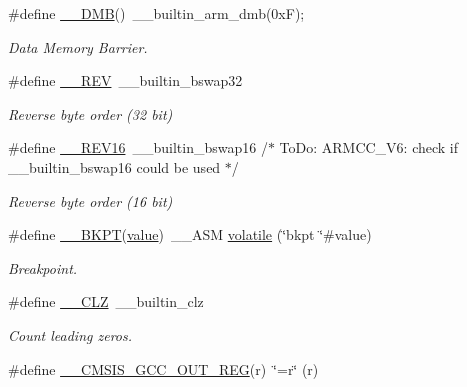 \begin{DoxyCompactItemize}
\#define \hyperlink{group___c_m_s_i_s___core___instruction_interface_ga671101179b5943990785f36f8c1e2269}{\+\_\+\+\_\+\+D\+MB}()~\+\_\+\+\_\+builtin\+\_\+arm\+\_\+dmb(0x\+F);
\begin{DoxyCompactList}\small\item\em Data Memory Barrier. \end{DoxyCompactList}\item 
\#define \hyperlink{group___c_m_s_i_s___core___instruction_interface_ga14f54807872c0f5e05604c4924abfdae}{\+\_\+\+\_\+\+R\+EV}~\+\_\+\+\_\+builtin\+\_\+bswap32
\begin{DoxyCompactList}\small\item\em Reverse byte order (32 bit) \end{DoxyCompactList}\item 
\#define \hyperlink{group___c_m_s_i_s___core___instruction_interface_ga4e3acd41e7667cdf65ffcd8c76a8613f}{\+\_\+\+\_\+\+R\+E\+V16}~\+\_\+\+\_\+builtin\+\_\+bswap16                           /$\ast$ To\+Do\+:  A\+R\+M\+C\+C\+\_\+\+V6\+: check if \+\_\+\+\_\+builtin\+\_\+bswap16 could be used $\ast$/
\begin{DoxyCompactList}\small\item\em Reverse byte order (16 bit) \end{DoxyCompactList}\item 
\#define \hyperlink{group___c_m_s_i_s___core___instruction_interface_ga15ea6bd3c507d3e81c3b3a1258e46397}{\+\_\+\+\_\+\+B\+K\+PT}(\hyperlink{semihosting_8h_aacce635d68067370c70caa2381ea1040}{value})~\+\_\+\+\_\+\+A\+SM \hyperlink{semihosting_8h_a65e6ad7ed1b130fda2cf7f6a0861fca9}{volatile} (\char`\"{}bkpt \char`\"{}\#value)
\begin{DoxyCompactList}\small\item\em Breakpoint. \end{DoxyCompactList}\item 
\#define \hyperlink{group___c_m_s_i_s___core___instruction_interface_ga5d5bb1527e042be4a9fa5a33f65cc248}{\+\_\+\+\_\+\+C\+LZ}~\+\_\+\+\_\+builtin\+\_\+clz
\begin{DoxyCompactList}\small\item\em Count leading zeros. \end{DoxyCompactList}\item 
\#define \hyperlink{group___c_m_s_i_s___core___instruction_interface_gabc17e391c13c71702366c67cba39c276}{\+\_\+\+\_\+\+C\+M\+S\+I\+S\+\_\+\+G\+C\+C\+\_\+\+O\+U\+T\+\_\+\+R\+EG}(r)~\char`\"{}=r\char`\"{} (r)
\item 

\end{DoxyCompactItemize}
